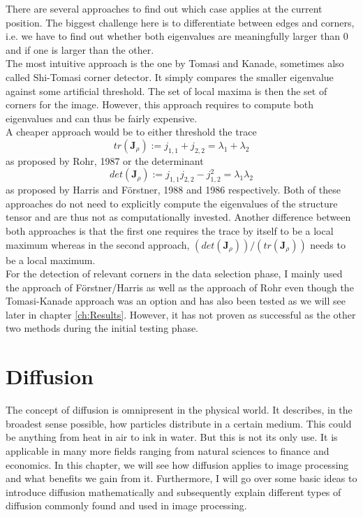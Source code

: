 There are several approaches to find out which case applies at the current position. The biggest
challenge here is to differentiate between edges and corners, i.e. we have to find out whether both
eigenvalues are meaningfully larger than 0 and if one is larger than the other.\\
The most intuitive approach is the one by Tomasi and Kanade, sometimes also called Shi-Tomasi
corner detector. It simply compares the smaller eigenvalue against some artificial
threshold. The set of local maxima is then the set of corners for the image\cite{shitomasi94}.
However, this approach requires to compute both eigenvalues and can thus be fairly expensive.\\
A cheaper approach would be to either threshold the trace \[tr(\mathbf{J}_\rho) := j_{1, 1} + j_{2,
        2} = \lambda_1 + \lambda_2\] as proposed by Rohr, 1987 or the determinant \[det(\mathbf{J}_\rho) := j_{1, 1}j_{2, 2} -
    j_{1, 2}^2 = \lambda_1\lambda_2\] as proposed by Harris and F\"orstner, 1988 and 1986
respectively\cite{harris88}. Both of these approaches do not need to explicitly compute the eigenvalues of
the structure tensor and are thus not as computationally invested. Another difference between both 
approaches is that the first one requires the trace by itself to be a local maximum whereas in the
second approach, $(det(\mathbf{J}_\rho))/(tr(\mathbf{J}_\rho))$ needs to be a local maximum.\\

For the detection of relevant corners in the data selection phase, I mainly used the approach of F\"orstner/Harris as well as
the approach of Rohr even though the Tomasi-Kanade approach was an option and has also been
tested as we will see later in chapter \ref{ch:Results}. However, it has not proven as successful
as the other two methods during the initial testing phase.
\section{Diffusion}\label{sec:Diffusion}
The concept of diffusion is omnipresent in the physical world. It describes, in the broadest sense
possible, how particles distribute in a certain medium. This could be anything from heat in air to
ink in water. But this is not its only use. It is applicable in many more fields ranging from
natural sciences to finance and economics. In this chapter, we will see how diffusion applies to
image processing and what benefits we gain from it. Furthermore, I will go over some basic ideas to
introduce diffusion mathematically and subsequently explain different types of diffusion commonly
found and used in image processing.
